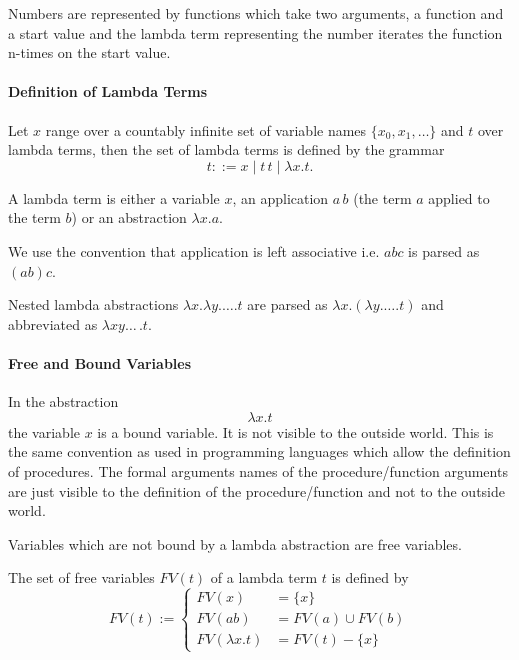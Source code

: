 Numbers are represented by functions which take two arguments, a function and
a start value and the lambda term representing the number iterates the
function n-times on the start value.



\paragraph{Definition of Lambda Terms}

\begin{definition}
  Let $x$ range over a countably infinite set of variable names
  $\{x_0, x_1, \ldots\}$ and $t$ over lambda terms, then the set of lambda
  terms is defined by the grammar $$t ::= x \mid t\, t \mid \lambda x. t.$$
\end{definition}

A lambda term is either a variable $x$, an application $a\,b$ (the term $a$
applied to the term $b$) or an abstraction $\lambda x.a$.

We use the convention that application is left associative i.e. $a b c$ is
parsed as $(a b) c$.

Nested lambda abstractions $\lambda x. \lambda y. \ldots . t$
are parsed as $\lambda x. (\lambda y. \ldots . t)$ and
abbreviated as $\lambda x y \ldots\, . t$.


\paragraph{Free and Bound Variables}

In the abstraction $$ \lambda x. t$$ the variable $x$ is a bound variable. It
is not visible to the outside world. This is the same convention as used in
programming languages which allow the definition of procedures. The formal
arguments names of the procedure/function arguments are just visible to the
definition of the procedure/function and not to the outside world.

Variables which are not bound by a lambda abstraction are free variables.

\begin{definition}
  The set of free variables $FV(t)$ of a lambda term $t$ is defined by
  $$FV(t) :=
  \begin{cases} FV(x) &= \{x\} \\
     FV(a b) &= FV(a) \cup FV(b) \\
     FV(\lambda x. t) &= FV(t) - \{x\}
   \end{cases}
   $$
\end{definition}

